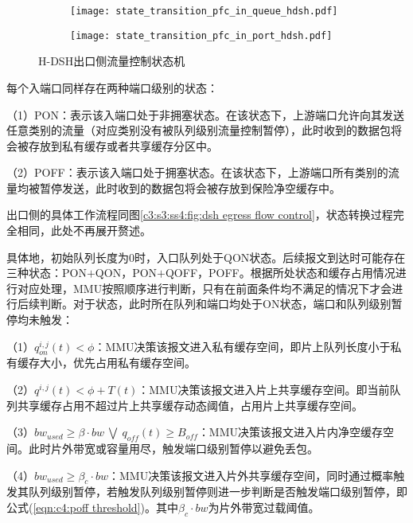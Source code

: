 \begin{figure}[H]
  \begin{subfigure}[b]{0.49\linewidth}
      \centering
      \texttt{[image: state\_transition\_pfc\_in\_queue\_hdsh.pdf]}
      \label{c4:s3:ss4:fig:sub1h:dsh ingress queue state transition}
  \end{subfigure}
  \begin{subfigure}[b]{0.49\linewidth}
      \centering
      \texttt{[image: state\_transition\_pfc\_in\_port\_hdsh.pdf]}
      \label{c4:s3:ss4:fig:sub2:hdsh ingress port state transition}
  \end{subfigure}
  \caption{H-DSH出口侧流量控制状态机}
  \label{c4:s3:ss4:fig:hdsh ingress flow control}
\end{figure}

每个入端口同样存在两种端口级别的状态：

\setcounter{paragraph}{0}
（1）PON：表示该入端口处于非拥塞状态。在该状态下，上游端口允许向其发送任意类别的流量（对应类别没有被队列级别流量控制暂停），此时收到的数据包将会被存放到私有缓存或者共享缓存分区中。

（2）POFF：表示该入端口处于拥塞状态。在该状态下，上游端口所有类别的流量均被暂停发送，此时收到的数据包将会被存放到保险净空缓存中。

出口侧的具体工作流程同图\ref{c3:s3:ss4:fig:dsh egress flow control}，状态转换过程完全相同，此处不再展开赘述。

具体地，初始队列长度为0时，入口队列处于QON状态。后续报文到达时可能存在三种状态：PON$+$QON，PON$+$QOFF，POFF。根据所处状态和缓存占用情况进行对应处理，MMU按照顺序进行判断，只有在前面条件均不满足的情况下才会进行后续判断。对于状态，此时所在队列和端口均处于ON状态，端口和队列级别暂停均未触发：

\setcounter{paragraph}{0}

（1）$q^{i,j}_{on}(t)<\phi$：MMU决策该报文进入私有缓存空间，即片上队列长度小于私有缓存大小，优先占用私有缓存空间。

（2）$q^{i,j}(t)< \phi+T(t)$：MMU决策该报文进入片上共享缓存空间。即当前队列共享缓存占用不超过片上共享缓存动态阈值，占用片上共享缓存空间。

（3）$bw_{used} \geqslant \beta \cdot bw ~\bigvee ~q_{off}(t) \geqslant B_{off}$：MMU决策该报文进入片内净空缓存空间。此时片外带宽或容量用尽，触发端口级别暂停以避免丢包。

（4）$bw_{used} \geqslant \beta_{c} \cdot bw$：MMU决策该报文进入片外共享缓存空间，同时通过概率触发其队列级别暂停，若触发队列级别暂停则进一步判断是否触发端口级别暂停，即公式(\ref{eqn:c4:poff threshold})。其中$\beta_c \cdot bw$为片外带宽过载阈值。

